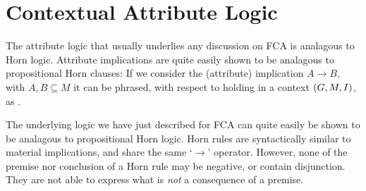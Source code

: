 \clearpage

\section{Contextual Attribute Logic}
\label{section:contextual-attribute-logic}

The attribute logic that usually underlies any discussion on FCA is analagous to Horn logic. Attribute implications are quite easily shown to be analagous to propositional Horn clauses: If we consider the (attribute) implication $A \rightarrow B$, with $A, B \subseteq M$ it can be phrased, with respect to holding in a context $(G,M,\mathrel{I})$, as .

The underlying logic we have just described for FCA can quite easily be shown to be analagous to propositional Horn logic. Horn rules are syntactically similar to material implications, and share the same `$\rightarrow$' operator. However, none of the premise nor conclusion of a Horn rule may be negative, or contain disjunction. They are not able to express what is \textit{not} a consequence of a premise.
